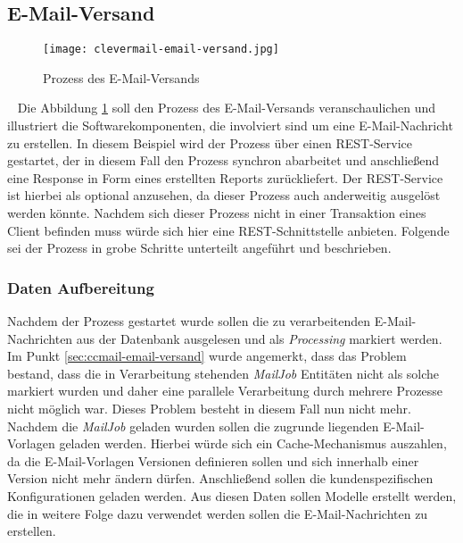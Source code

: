 \subsection{E-Mail-Versand}
\begin{figure}[h]
\centering
\texttt{[image: clevermail-email-versand.jpg]} %
\caption{Prozess des E-Mail-Versands}
\label{fig:clevermail-email-versand}
\end{figure}
\ \newpage
Die Abbildung \ref{fig:clevermail-email-versand} soll den Prozess des E-Mail-Versands veranschaulichen und illustriert die Softwarekomponenten, die involviert sind um eine E-Mail-Nachricht zu erstellen. In diesem Beispiel wird der Prozess über einen REST-Service gestartet, der in diesem Fall den Prozess synchron abarbeitet und anschließend eine Response in Form eines erstellten Reports zurückliefert. Der REST-Service ist hierbei als optional anzusehen, da dieser Prozess auch anderweitig ausgelöst werden könnte. Nachdem sich dieser Prozess nicht in einer Transaktion eines Client befinden muss würde sich hier eine REST-Schnittstelle anbieten.
\newline
\newline
Folgende sei der Prozess in grobe Schritte unterteilt angeführt und beschrieben.

\subsubsection{Daten Aufbereitung}
Nachdem der Prozess gestartet wurde sollen die zu verarbeitenden E-Mail-Nachrichten aus der Datenbank ausgelesen und als \emph{Processing} markiert werden. Im Punkt \ref{sec:ccmail-email-versand} wurde angemerkt, dass das Problem bestand, dass die in Verarbeitung stehenden \emph{MailJob} Entitäten nicht als solche markiert wurden und daher eine parallele Verarbeitung durch mehrere Prozesse nicht möglich war. Dieses Problem besteht in diesem Fall nun nicht mehr. Nachdem die \emph{MailJob} geladen wurden sollen die zugrunde liegenden E-Mail-Vorlagen geladen werden. Hierbei würde sich ein Cache-Mechanismus auszahlen, da die E-Mail-Vorlagen Versionen definieren sollen und sich innerhalb einer Version nicht mehr ändern dürfen. Anschließend sollen die kundenspezifischen Konfigurationen geladen werden. Aus diesen Daten sollen Modelle erstellt werden, die in weitere Folge dazu verwendet werden sollen die E-Mail-Nachrichten zu erstellen.

